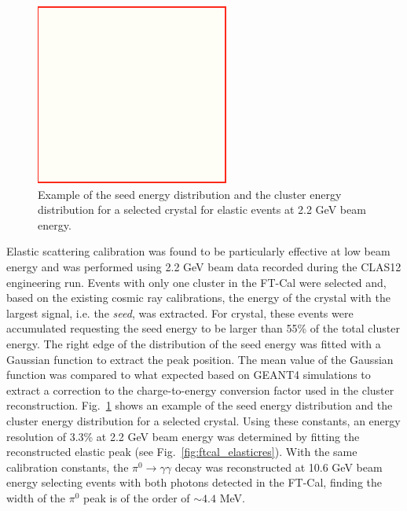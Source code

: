 \begin{figure}
\includegraphics[height=1.0\columnwidth]{fig/dummy.png}
\caption{Example of the seed energy distribution and the cluster energy distribution for a selected crystal for elastic events at 2.2 GeV beam energy.}
\label{fig:ftcal_elasticcal}
\end{figure}
Elastic scattering calibration was found to be particularly effective at low beam energy and was performed using 2.2 GeV beam data recorded during the CLAS12 engineering run. Events with only one cluster in the FT-Cal were selected and, based on the existing cosmic ray calibrations, the energy of the crystal with the largest signal, i.e. the {\it seed}, was extracted. For crystal, these events were accumulated requesting the seed energy to be larger than 55\% of the total cluster energy. The right edge of the distribution of the seed energy was fitted with a Gaussian function to extract the peak position. The mean value of the Gaussian function was compared to what expected based on GEANT4 simulations to extract a correction to the charge-to-energy conversion factor used in the cluster reconstruction. Fig.~\ref{fig:ftcal_elasticcal} shows an example of the seed energy distribution and the cluster energy distribution for a selected crystal. Using these constants, an energy resolution of  3.3\% at 2.2 GeV beam energy was determined by fitting the reconstructed elastic peak (see Fig.~\ref{fig:ftcal_elasticres}). With the same calibration constants, the $\pi^0\to\gamma\gamma$ decay was reconstructed at 10.6 GeV beam energy selecting events with both photons detected in the FT-Cal, finding the width of the $\pi^0$ peak is of the order of $\sim 4.4$ MeV.
